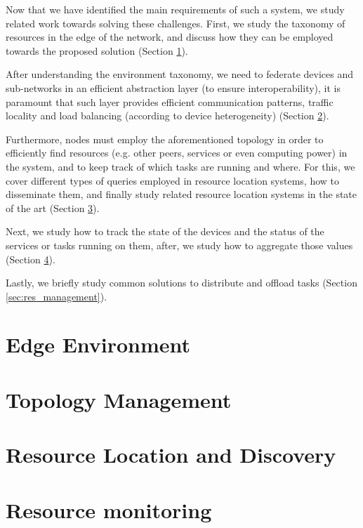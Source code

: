 Now that we have identified the main requirements of such a system, we study related work towards solving these challenges. First, we study the taxonomy of resources in the edge of the network, and discuss how they can be employed towards the proposed solution (Section \ref{sec:edge_computing}).

After understanding the environment taxonomy, we need to federate devices and sub-networks in an efficient abstraction layer (to ensure interoperability), it is paramount that such layer provides efficient communication patterns, traffic locality and load balancing (according to device heterogeneity) (Section \ref{sec:topology_management}).

Furthermore, nodes must employ the aforementioned topology in order to efficiently find resources (e.g. other peers, services or even computing power) in the system, and to keep track of which tasks are running and where. For this, we cover different types of queries employed in resource location systems, how to disseminate them, and finally study related resource location systems in the state of the art (Section \ref{sec:res_location}).

Next, we study how to track the state of the devices and the status of the services or tasks running on them, after, we study how to aggregate those values (Section \ref{sec:res_monitoring}). 

Lastly, we briefly study common solutions to distribute and offload tasks (Section \ref{sec:res_management}). 

\section{Edge Environment} \label{sec:edge_computing} 

\section{Topology Management} \label{sec:topology_management} 

\section{Resource Location and Discovery} \label{sec:res_location} 

\section{Resource monitoring} \label{sec:res_monitoring} 


